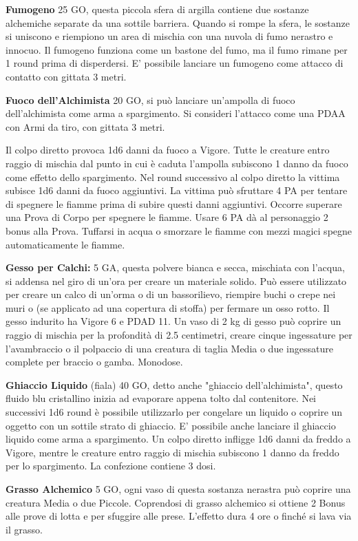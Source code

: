 \documentclass[12pt,a4paper,twoside,openany]{book}
\begin{document}
\begin{multicols}{2}
\textbf{Fumogeno} 25 GO, questa piccola sfera di argilla contiene due sostanze alchemiche separate da una sottile barriera. Quando si rompe la sfera, le sostanze si uniscono e riempiono un area di mischia con una nuvola di fumo nerastro e innocuo. Il fumogeno funziona come un bastone del fumo, ma il fumo rimane per 1 round prima di disperdersi. E' possibile lanciare un fumogeno come attacco di contatto con gittata 3 metri.

\textbf{Fuoco dell'Alchimista} 20 GO, si può lanciare un'ampolla di fuoco dell'alchimista come arma a spargimento. Si consideri l'attacco come una PDAA con Armi da tiro, con gittata 3 metri.

Il colpo diretto provoca 1d6 danni da fuoco a Vigore. Tutte le creature entro raggio di mischia dal punto in cui è caduta l'ampolla subiscono 1 danno da fuoco come effetto dello spargimento. Nel round successivo al colpo diretto la vittima subisce 1d6 danni da fuoco aggiuntivi. La vittima può sfruttare 4 PA per tentare di spegnere le fiamme prima di subire questi danni aggiuntivi. Occorre superare una Prova di Corpo per spegnere le fiamme. Usare 6 PA dà al personaggio 2 bonus alla Prova. Tuffarsi in acqua o smorzare le fiamme con mezzi magici spegne automaticamente le fiamme.

\textbf{Gesso per Calchi:} 5 GA, questa polvere bianca e secca, mischiata con l'acqua, si addensa nel giro di un'ora per creare un materiale solido. Può essere utilizzato per creare un calco di un'orma o di un bassorilievo, riempire buchi o crepe nei muri o (se applicato ad una copertura di stoffa) per fermare un osso rotto. Il gesso indurito ha Vigore 6 e PDAD 11. Un vaso di 2 kg di gesso può coprire un raggio di mischia per la profondità di 2.5 centimetri, creare cinque ingessature per l'avambraccio o il polpaccio di una creatura di taglia Media o due ingessature complete per braccio o gamba. Monodose.

\textbf{Ghiaccio Liquido} (fiala) 40 GO, detto anche "ghiaccio dell'alchimista", questo fluido blu cristallino inizia ad evaporare appena tolto dal contenitore. Nei successivi 1d6 round è possibile utilizzarlo per congelare un liquido o coprire un oggetto con un sottile strato di ghiaccio. E' possibile anche lanciare il ghiaccio liquido come arma a spargimento. Un colpo diretto infligge 1d6 danni da freddo a Vigore, mentre le creature entro raggio di mischia subiscono 1 danno da freddo per lo spargimento. La confezione contiene 3 dosi.

\textbf{Grasso Alchemico} 5 GO, ogni vaso di questa sostanza nerastra può coprire una creatura Media o due Piccole. Coprendosi di grasso alchemico si ottiene 2 Bonus alle prove di lotta e per sfuggire alle prese. L'effetto dura 4 ore o finché si lava via il grasso.


\end{multicols}
\end{document}
